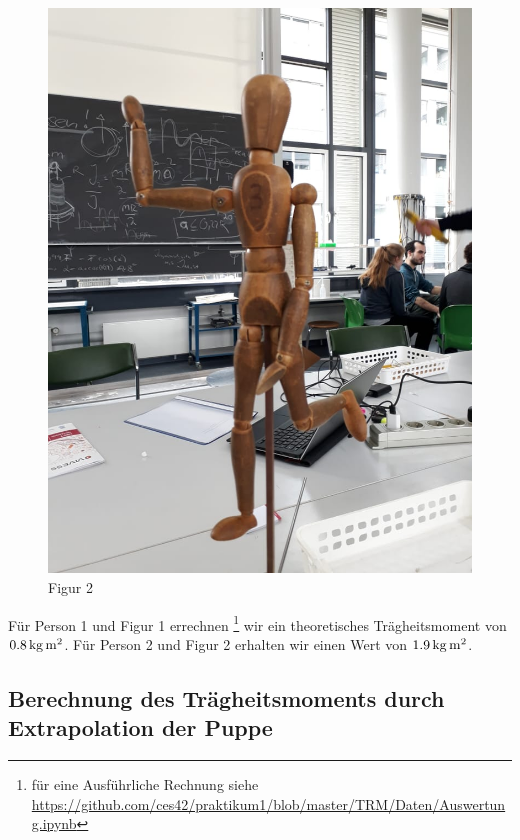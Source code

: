 \begin{figure}
\begin{minipage}{.49\textwidth}
    \includegraphics[scale=.28]{./Bilder/figur2.jpeg}
    \caption{Figur 2}
    \label{fig:2}
\end{minipage}
\end{figure}


Für Person 1 und Figur 1 errechnen%
\footnote{für eine Ausführliche Rechnung siehe \url{https://github.com/ces42/praktikum1/blob/master/TRM/Daten/Auswertung.ipynb}}
wir ein theoretisches Trägheitsmoment von  $\unit[0.8]{kg\,m^2}$. Für Person 2 und Figur 2 erhalten wir einen Wert von $\unit[1.9]{kg\,m^2}$. 

\subsection{Berechnung des Trägheitsmoments durch Extrapolation der Puppe}



